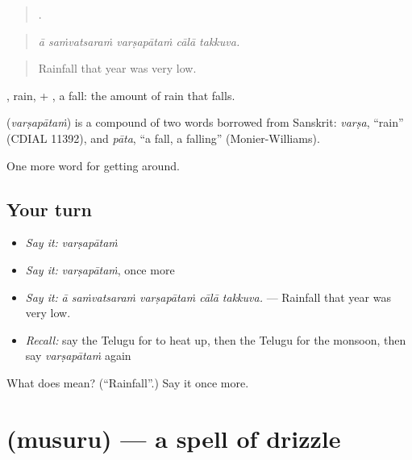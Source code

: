 \begin{quote}
    .
\end{quote}

\begin{quote}
\emph{ā saṁvatsaraṁ varṣapātaṁ cālā takkuva.}
\end{quote}

\begin{quote}
Rainfall that year was very low.
\end{quote}

, rain, + , a fall: the amount of rain that falls.

\begin{cousinweb}
\textbf{} (\emph{varṣapātaṁ}) is a compound of two words borrowed from Sanskrit: \emph{varṣa}, \textquotedblleft{}rain\textquotedblright{} (CDIAL 11392), and \emph{pāta}, \textquotedblleft{}a fall, a falling\textquotedblright{} (Monier-Williams).
\end{cousinweb}

\begin{grammarlens}[title={What you've built}]
One more word for getting around.
\end{grammarlens}

\subsection*{Your turn}
\begin{itemize}
\raggedright
  \item \emph{Say it:} \emph{varṣapātaṁ}
  \item \emph{Say it:} \emph{varṣapātaṁ}, once more
  \item \emph{Say it:} \emph{ā saṁvatsaraṁ varṣapātaṁ cālā takkuva.} — Rainfall that year was very low.
  \item \emph{Recall:} say the Telugu for to heat up, then the Telugu for the monsoon, then say \emph{varṣapātaṁ} again
\end{itemize}

\begin{tcolorbox}[breakable,colback=teal!4,colframe=teal!35!black,title={Before you move on}]
What does  mean? (\textquotedblleft{}Rainfall\textquotedblright{}.) Say it once more.
\end{tcolorbox}
\section[\texorpdfstring{\te{ముసురు} (musuru)}{ముసురు (musuru)}]{ (musuru) — a spell of drizzle}

